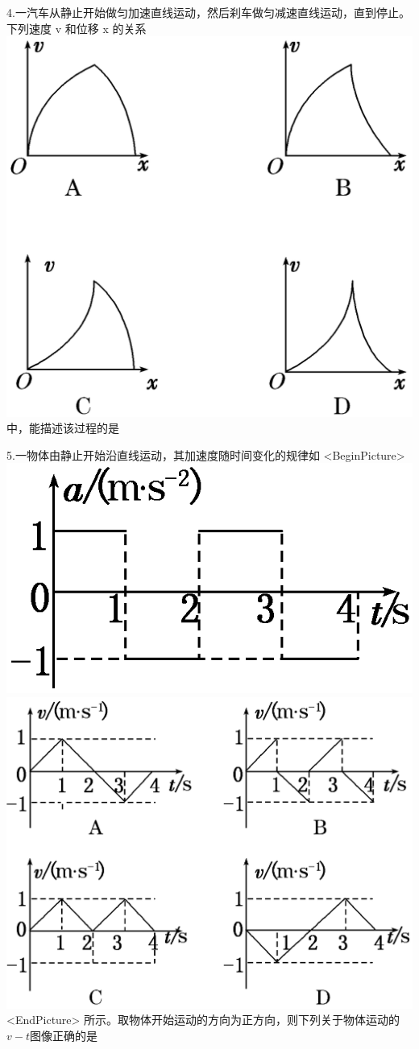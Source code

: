 \documentclass[a4paper,fontset = windows]{ctexbook} %
\begin{document}
\begin{jisuan}
   4.一汽车从静止开始做匀加速直线运动，然后刹车做匀减速直线运动，直到停止。下列速度 v 和位移 x 的关系
\includegraphics{../picture/1-3/004.png} 
中，能描述该过程的是

   5.一物体由静止开始沿直线运动，其加速度随时间变化的规律如
   <BeginPicture>
   \includegraphics{../picture/1-3/005.png} 
   \includegraphics{../picture/1-3/006.png} 
   <EndPicture>
   所示。取物体开始运动的方向为正方向，则下列关于物体运动的$v-t$图像正确的是


\end{jisuan}
\end{document}

